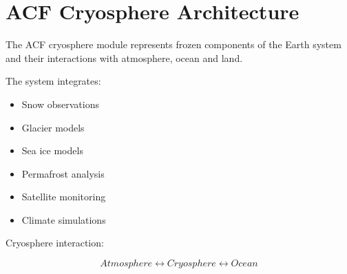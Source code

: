 \section{ACF Cryosphere Architecture}


The ACF cryosphere module represents frozen components of the
Earth system and their interactions with atmosphere, ocean and
land.



The system integrates:


\begin{itemize}

\item Snow observations

\item Glacier models

\item Sea ice models

\item Permafrost analysis

\item Satellite monitoring

\item Climate simulations

\end{itemize}



Cryosphere interaction:


\begin{equation}
Atmosphere
\leftrightarrow
Cryosphere
\leftrightarrow
Ocean
\end{equation}
